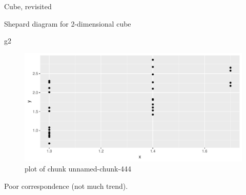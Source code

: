 \documentclass[ignorenonframetext,]{beamer}
\newenvironment{Shaded}{\begin{snugshade}}{\end{snugshade}}
\newcommand{\DataTypeTok}[1]{\textcolor[rgb]{0.13,0.29,0.53}{#1}}
\newcommand{\FloatTok}[1]{\textcolor[rgb]{0.00,0.00,0.81}{#1}}
\newcommand{\KeywordTok}[1]{\textcolor[rgb]{0.13,0.29,0.53}{\textbf{#1}}}
\newcommand{\NormalTok}[1]{#1}
\newcommand{\OperatorTok}[1]{\textcolor[rgb]{0.81,0.36,0.00}{\textbf{#1}}}
\newcommand{\StringTok}[1]{\textcolor[rgb]{0.31,0.60,0.02}{#1}}
\begin{document}
\begin{frame}[fragile]{Cube, revisited}
\begin{Shaded}
\end{Shaded}

\end{frame}

\begin{frame}[fragile]{Shepard diagram for 2-dimensional cube}
\protect\hypertarget{shepard-diagram-for-2-dimensional-cube}{}

\begin{Shaded}
\begin{Highlighting}[]
\NormalTok{g2}
\end{Highlighting}
\end{Shaded}

\begin{figure}
\centering
\includegraphics{figure/unnamed-chunk-444-1.pdf}
\caption{plot of chunk unnamed-chunk-444}
\end{figure}

Poor correspondence (not much trend).

\end{frame}
\end{document}

